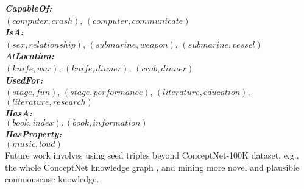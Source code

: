 \documentclass[11pt,a4paper]{article}
\begin{document}
\noindent
\textbf{\textit{CapableOf:}}\\
$(computer, crash)$, $(computer, communicate)$\\
\textbf{\textit{IsA:}}\\
$(sex, relationship)$, $(submarine, weapon)$, $(submarine, vessel)$\\
\textbf{\textit{AtLocation:}}\\
$(knife, war)$, $(knife, dinner)$, $(crab, dinner)$\\
\textbf{\textit{UsedFor:}}\\
$(stage, fun)$, $(stage, performance)$, $(literature, education)$, $(literature, research)$\\
\textbf{\textit{HasA:}}\\
$(book, index), (book, information)$\\
\textbf{\textit{HasProperty:}}\\
$(music, loud)$\\
Future work involves using seed triples beyond ConceptNet-100K dataset, e.g., the whole ConceptNet knowledge graph , and mining more novel and plausible commonsense knowledge.
\end{document}
